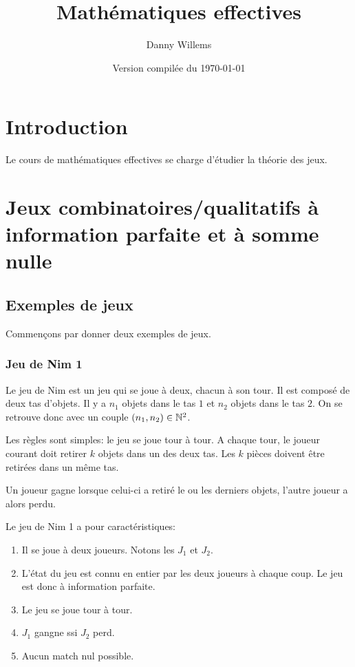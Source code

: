 \documentclass[a4paper, 11pt]{report}
\title{Mathématiques effectives}
\author{Danny Willems}
\date{Version compilée du \today}
\begin{document}
\maketitle

\tableofcontents

\chapter*{Introduction}

Le cours de mathématiques effectives se charge d'étudier la théorie des jeux.


\chapter{Jeux combinatoires/qualitatifs à information parfaite et à somme nulle}

\section{Exemples de jeux}

Commençons par donner deux exemples de jeux.

\subsection*{Jeu de Nim 1}

Le jeu de Nim est un jeu qui se joue à deux, chacun à son tour. Il est composé
de deux tas d'objets. Il y a $n_{1}$ objets dans le tas $1$ et $n_{2}$ objets
dans le tas $2$. On se retrouve donc avec un couple $(n_{1}, n_{2}) \in
\mathbb{N}^{2}$.

Les règles sont simples: le jeu se joue tour à tour. A chaque tour, le joueur
courant doit retirer $k$ objets dans un des deux tas. Les $k$ pièces doivent
être retirées dans un même tas.

Un joueur gagne lorsque celui-ci a retiré le ou les derniers objets, l'autre
joueur a alors perdu.

\begin{remarque}
	Le jeu de Nim 1 a pour caractéristiques:
	\begin{enumerate}
		\item Il se joue à deux joueurs. Notons les $J_{1}$ et $J_{2}$.
		\item L'état du jeu est connu en entier par les deux joueurs à chaque
			coup. Le jeu est donc à information parfaite.
		\item Le jeu se joue tour à tour.
		\item $J_{1}$ gangne ssi $J_{2}$ perd.
		\item Aucun match nul possible.
	\end{enumerate}
\end{remarque}
\end{document}

